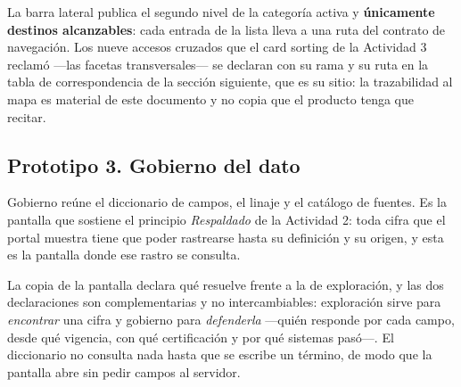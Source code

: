 
La barra lateral publica el segundo nivel de la categoría activa y \textbf{únicamente destinos
alcanzables}: cada entrada de la lista lleva a una ruta del contrato de navegación. Los nueve
accesos cruzados que el card sorting de la Actividad 3 reclamó ---las facetas transversales--- se
declaran con su rama y su ruta en la tabla de correspondencia de la sección siguiente, que es su
sitio: la trazabilidad al mapa es material de este documento y no copia que el producto tenga que
recitar.


\clearpage
\subsection{Prototipo 3. Gobierno del dato}

Gobierno reúne el diccionario de campos, el linaje y el catálogo de fuentes. Es la pantalla que
sostiene el principio \emph{Respaldado} de la Actividad 2: toda cifra que el portal muestra tiene
que poder rastrearse hasta su definición y su origen, y esta es la pantalla donde ese rastro se
consulta.

La copia de la pantalla declara qué resuelve frente a la de exploración, y las dos declaraciones son
complementarias y no intercambiables: exploración sirve para \emph{encontrar} una cifra y gobierno
para \emph{defenderla} ---quién responde por cada campo, desde qué vigencia, con qué certificación y
por qué sistemas pasó---. El diccionario no consulta nada hasta que se escribe un término, de modo
que la pantalla abre sin pedir campos al servidor.

